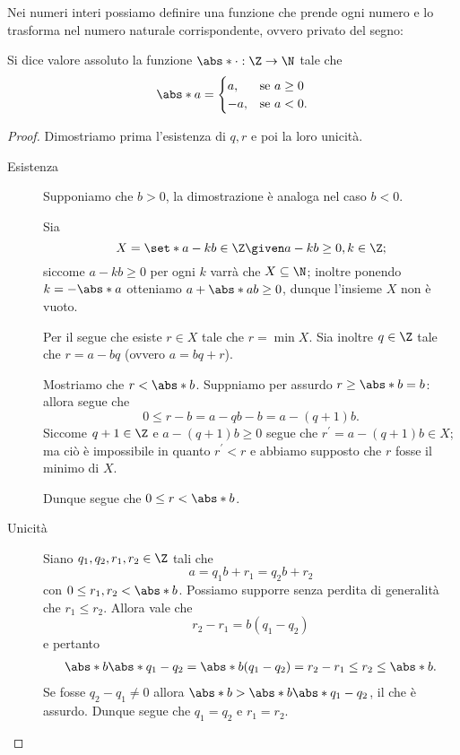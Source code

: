 Nei numeri interi possiamo definire una funzione che prende ogni numero e lo trasforma nel numero naturale corrispondente, ovvero privato del segno:
\begin{definition}
    Si dice valore assoluto la funzione $\abs*{\cdot} : \Z \to \N$ tale che \[
        \abs*{a} = \begin{cases}
            a, &\text{se } a \geq 0\\
            -a, &\text{se } a < 0.
        \end{cases}    
    \]
\end{definition}

\begin{proof}
    Dimostriamo prima l'esistenza di $q, r$ e poi la loro unicità.
    \begin{description}
        \item[Esistenza] Supponiamo che $b > 0$, la dimostrazione è analoga nel caso $b < 0$. 
        
        Sia \[
            X = \set*{a - kb \in \Z \given a-kb \geq 0, k \in \Z};
        \] siccome $a-kb \geq 0$ per ogni $k$ varrà che $X \subseteq \N$; inoltre ponendo $k = -\abs*{a}$ otteniamo $a+ \abs*{a}b \geq 0$, dunque l'insieme $X$ non è vuoto.

        Per il  segue che esiste $r \in X$ tale che $r = \min X$. Sia inoltre $q \in \Z$ tale che $r = a - bq$ (ovvero $a = bq + r$).

        Mostriamo che $r < \abs*{b}$. Suppniamo per assurdo $r \geq \abs*{b} = b$: allora segue che \[
            0 \leq r - b = a - qb - b = a - (q+1)b.   
        \] Siccome $q+1 \in \Z$ e $a - (q+1)b \geq 0$ segue che $r^\prime = a-(q+1)b \in X$; ma ciò è impossibile in quanto $r^\prime < r$ e abbiamo supposto che $r$ fosse il minimo di $X$.

        Dunque segue che $0 \leq r < \abs*{b}$.
        \item[Unicità] Siano $q_1, q_2, r_1, r_2 \in \Z$ tali che \[
            a = q_1b + r_1 = q_2b + r_2    
        \] con $0 \leq r_1, r_2 < \abs*{b}$. Possiamo supporre senza perdita di generalità che $r_1 \leq r_2$.
        Allora vale che \[
            r_2 - r_1 = b(q_1 - q_2)  
        \] e pertanto \begin{align*}
            \abs*{b}\abs*{q_1 - q_2} = \abs*{b(q_1 - q_2)} = r_2 - r_1 \leq r_2 \leq \abs*{b}.
        \end{align*} Se fosse $q_2 - q_1 \neq 0$ allora $\abs*{b} > \abs*{b}\abs*{q_1 - q_2}$, il che è assurdo.
        Dunque segue che $q_1 = q_2$ e $r_1 = r_2$. \qedhere
    \end{description}
\end{proof}